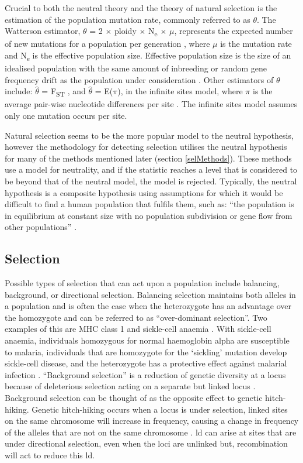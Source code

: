 \documentclass[]{report}
\begin{document}
Crucial to both the neutral theory and the theory of natural selection
is the estimation of the population mutation rate, commonly referred to
as \(\theta\). The Watterson estimator, \(\theta\) = 2 \(\times\) ploidy
\(\times\) N\textsubscript{e} \(\times\) \(\mu\), represents the
expected number of new mutations for a population per generation
\citep{Watterson1975}, where \(\mu\) is the mutation rate and
N\textsubscript{e} is the effective population size. Effective
population size is the size of an idealised population with the same
amount of inbreeding or random gene frequency drift as the population
under consideration \citep{KimuraCrow1963}. Other estimators of
\(\theta\) include: \(\hat{\theta}\) = F\textsubscript{ST}
\citep{Weir1984}, and \(\hat{\theta}\) = E(\(\pi\)), in the infinite
sites model, where \(\pi\) is the average pair-wise nucleotide
differences per site \citep{Tajima1996a}. The infinite sites model
assumes only one mutation occurs per site.

Natural selection seems to be the more popular model to the neutral
hypothesis, however the methodology for detecting selection utilises the
neutral hypothesis for many of the methods mentioned later (section
\ref{selMethods}). These methods use a model for neutrality, and if the
statistic reaches a level that is considered to be beyond that of the
neutral model, the model is rejected. Typically, the neutral hypothesis
is a composite hypothesis using assumptions for which it would be
difficult to find a human population that fulfils them, such as: ``the
population is in equilibrium at constant size with no population
subdivision or gene flow from other populations'' \citep{Nielsen2005a}.

\subsection{Selection}\label{selection}

Possible types of selection that can act upon a population include
balancing, background, or directional selection. Balancing selection
maintains both alleles in a population and is often the case when the
heterozygote has an advantage over the homozygote and can be referred to
as ``over-dominant selection''. Two examples of this are MHC class 1
\citep{Hughes1988} and sickle-cell anaemia \citep{Allison1956}. With
sickle-cell anaemia, individuals homozygous for normal haemoglobin alpha
are susceptible to malaria, individuals that are homozygote for the
`sickling' mutation develop sickle-cell disease, and the heterozygote
has a protective effect against malarial infection \citep{Aidoo2002}.
``Background selection'' is a reduction of genetic diversity at a locus
because of deleterious selection acting on a separate but linked locus
\citep{Charlesworth1993}. Background selection can be thought of as the
opposite effect to genetic hitch-hiking. Genetic hitch-hiking occurs
when a locus is under selection, linked sites on the same chromosome
will increase in frequency, causing a change in frequency of the alleles
that are not on the same chromosome \citep{Smith1974}. \Gls{ld} can
arise at sites that are under directional selection, even when the loci
are unlinked \citep{Felsenstein1965} but, recombination will act to
reduce this \gls{ld}.
\end{document}
